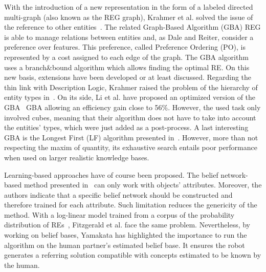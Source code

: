 With the introduction of a new representation in the form of a labeled directed multi-graph (also known as the REG graph), Krahmer et al. solved the issue of the reference to other entities~\cite{krahmer_2003_graph}. The related Graph-Based Algorithm (GBA) REG is able to manage relations between entities and, as Dale and Reiter, consider a preference over features. This preference, called Preference Ordering (PO), is represented by a cost assigned to each edge of the graph. The GBA algorithm uses a branch\&bound algorithm which allows finding the optimal RE. On this new basis, extensions have been developed or at least discussed. Regarding the thin link with Description Logic, Krahmer raised the problem of the hierarchy of entity types in~\cite{krahmer_2012_computational}. On its side, Li et al. have proposed an optimized version of the GBA~\cite{li_2017_automatically} GBA allowing an efficiency gain close to 56\%. However, the used task only involved cubes, meaning that their algorithm does not have to take into account the entities' types, which were just added as a post-process. A last interesting GBA is the Longest First (LF) algorithm presented in~\cite{viethen_2013_graphs}. However, more than not respecting the maxim of quantity, its exhaustive search entails poor performance when used on larger realistic knowledge bases.

Learning-based approaches have of course been proposed. The belief network-based method presented in~\cite{yamakata_2004_belief} can only work with objects' attributes. Moreover, the authors indicate that a specific belief network should be constructed and therefore trained for each attribute. Such limitation reduces the genericity of the method. With a log-linear model trained from a corpus of the probability distribution of REs~\cite{fitzgerald_2013_learning}, Fitzgerald et al. face the same problem. Nevertheless, by working on belief bases, Yamakata has highlighted the importance to run the algorithm on the human partner's estimated belief base. It ensures the robot generates a referring solution compatible with concepts estimated to be known by the human.

